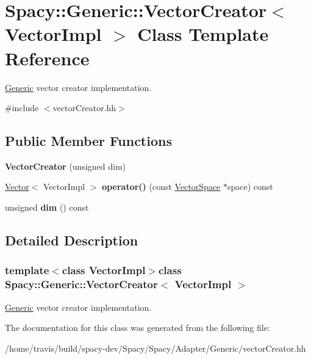\hypertarget{classSpacy_1_1Generic_1_1VectorCreator}{\section{Spacy\-:\-:Generic\-:\-:Vector\-Creator$<$ Vector\-Impl $>$ Class Template Reference}
\label{classSpacy_1_1Generic_1_1VectorCreator}
}


\hyperlink{namespaceSpacy_1_1Generic}{Generic} vector creator implementation.  




{\ttfamily \#include $<$vector\-Creator.\-hh$>$}

\subsection*{Public Member Functions}
\begin{DoxyCompactItemize}
\item 
\hypertarget{classSpacy_1_1Generic_1_1VectorCreator_a19fcd1bd6edb602294cf1c1eedc64c55}{{\bfseries Vector\-Creator} (unsigned dim)}\label{classSpacy_1_1Generic_1_1VectorCreator_a19fcd1bd6edb602294cf1c1eedc64c55}

\item 
\hypertarget{classSpacy_1_1Generic_1_1VectorCreator_ad394c7a64f4270c89e13af1f75649ad9}{\hyperlink{classSpacy_1_1Generic_1_1Vector}{Vector}$<$ Vector\-Impl $>$ {\bfseries operator()} (const \hyperlink{classSpacy_1_1VectorSpace}{Vector\-Space} $\ast$space) const }\label{classSpacy_1_1Generic_1_1VectorCreator_ad394c7a64f4270c89e13af1f75649ad9}

\item 
\hypertarget{classSpacy_1_1Generic_1_1VectorCreator_a1f1e7616f7319b511655873eed442088}{unsigned {\bfseries dim} () const }\label{classSpacy_1_1Generic_1_1VectorCreator_a1f1e7616f7319b511655873eed442088}

\end{DoxyCompactItemize}


\subsection{Detailed Description}
\subsubsection*{template$<$class Vector\-Impl$>$class Spacy\-::\-Generic\-::\-Vector\-Creator$<$ Vector\-Impl $>$}

\hyperlink{namespaceSpacy_1_1Generic}{Generic} vector creator implementation. 

The documentation for this class was generated from the following file\-:\begin{DoxyCompactItemize}
\item 
/home/travis/build/spacy-\/dev/\-Spacy/\-Spacy/\-Adapter/\-Generic/vector\-Creator.\-hh\end{DoxyCompactItemize}
